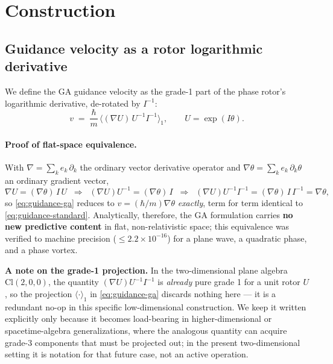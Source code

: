 \documentclass[11pt]{article}
\newcommand{\Cl}{\mathrm{Cl}}
\begin{document}
\section{Construction}

\subsection{Guidance velocity as a rotor logarithmic derivative}

We define the GA guidance velocity as the grade-1 part of the phase rotor's logarithmic derivative, de-rotated by $I^{-1}$:
\begin{equation}
v \;=\; \frac{\hbar}{m}\,\big\langle (\nabla U)\,U^{-1} I^{-1} \big\rangle_1 , \qquad U = \exp(I\theta).
\label{eq:guidance-ga}
\end{equation}

\paragraph{Proof of flat-space equivalence.} With $\nabla = \sum_k e_k\,\partial_k$ the ordinary vector derivative operator and $\nabla \theta = \sum_k e_k\,\partial_k \theta$ an ordinary gradient vector,
\begin{equation}
\nabla U = (\nabla \theta)\,I\,U
\;\;\Longrightarrow\;\;
(\nabla U)U^{-1} = (\nabla \theta)\,I
\;\;\Longrightarrow\;\;
(\nabla U)U^{-1}I^{-1} = (\nabla \theta)\,I\,I^{-1} = \nabla \theta,
\end{equation}
so \eqref{eq:guidance-ga} reduces to $v=(\hbar/m)\nabla \theta$ \emph{exactly}, term for term identical to \eqref{eq:guidance-standard}. Analytically, therefore, the GA formulation carries \textbf{no new predictive content} in flat, non-relativistic space; this equivalence was verified to machine precision ($\le 2.2\times10^{-16}$) for a plane wave, a quadratic phase, and a phase vortex.

\textbf{A note on the grade-1 projection.} In the two-dimensional plane algebra $\Cl(2,0,0)$, the quantity $(\nabla U)U^{-1}I^{-1}$ is \emph{already} pure grade 1 for a unit rotor $U$, so the projection $\langle\cdot\rangle_1$ in \eqref{eq:guidance-ga} discards nothing here — it is a redundant no-op in this specific low-dimensional construction. We keep it written explicitly only because it becomes load-bearing in higher-dimensional or spacetime-algebra generalizations, where the analogous quantity can acquire grade-3 components that must be projected out; in the present two-dimensional setting it is notation for that future case, not an active operation.
\end{document}

